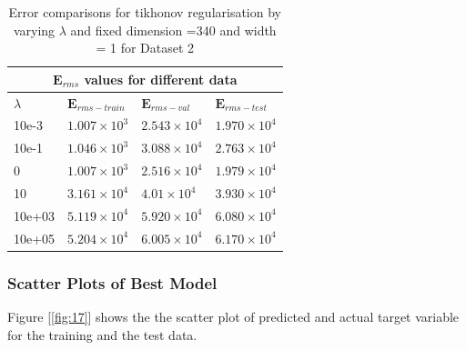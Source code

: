 {
\begin{table}[hptb]
\begin{tabular}{ |p{1.5cm}|p{3cm}|p{3cm}| p{3cm}|  }
\hline
\multicolumn{4}{|c|}{$\mathbf{E}_{rms}$ values for different data } \\
\hline
\rowcolor{lightgray} $\lambda$ & $\mathbf{E}_{rms-train}$ & $\mathbf{E}_{rms-val}$ & $\mathbf{E}_{rms-test}$ \\
\hline
  10e-3  &   $1.007 \times 10^3$       &       $2.543 \times 10^4$        &     $1.970 \times 10^4$     \\
 \hline
  10e-1  &   $1.046 \times 10^3$       &       $3.088 \times 10^4$       &     $2.763 \times 10^4$    \\
 \hline
  0  &    $1.007 \times 10^3$     &      $2.516 \times 10^4 $         &     $1.979 \times 10^4$      \\
  \hline
  10     &   $3.161 \times 10^4$   &        $4.01 \times 10^4$         &     $3.930 \times 10^4$      \\
  \hline
  10e+03   &   $5.119 \times 10^4$    &         $5.920 \times 10^4$      &      $6.080 \times 10^4$        \\
  \hline
  10e+05  &    $5.204 \times 10^4$  &         $6.005 \times 10^4$       &        $6.170 \times 10^4$      \\
\hline
\end{tabular}
\caption{Error comparisons for tikhonov regularisation by varying $\lambda $  and fixed dimension =340 and width = 1 for Dataset 2}
\label{table:10}
\end{table}
}

\newpage
\subsubsection{Scatter Plots of Best Model}
Figure [\ref{fig:17}] shows the the scatter plot of predicted and actual target variable for the training and the test data.

